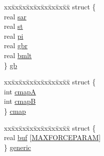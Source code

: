 \begin{DoxyCompactItemize}
\begin{tabbing}
\end{tabbing}\item 
\begin{tabbing}
xx\=xx\=xx\=xx\=xx\=xx\=xx\=xx\=xx\=\kill
struct \{\\
\>real \hyperlink{uniont__iparams_a46042eaae3e88c84bc680ea4d1108e84}{sar}\\
\>real \hyperlink{uniont__iparams_ae77e8a5af1b02825697a5520f754bb0a}{st}\\
\>real \hyperlink{uniont__iparams_a882ce1bd87228259c0185dac598e49e3}{pi}\\
\>real \hyperlink{uniont__iparams_a99d5340b9afa500ec28ed2511c91964f}{gbr}\\
\>real \hyperlink{uniont__iparams_a7f54768c60be5c76f2835aff5cd05d48}{bmlt}\\
\} \hyperlink{uniont__iparams_a2a1571b3d3a2d4c573c22b80619736c2}{gb}\\

\end{tabbing}\item 
\begin{tabbing}
xx\=xx\=xx\=xx\=xx\=xx\=xx\=xx\=xx\=\kill
struct \{\\
\>int \hyperlink{uniont__iparams_a96108be8534affe967e3a4aec97cb72c}{cmapA}\\
\>int \hyperlink{uniont__iparams_af112bc252ed4633980dca8b8756c27ad}{cmapB}\\
\} \hyperlink{uniont__iparams_ad858cc94bb34388aba59412447819a95}{cmap}\\

\end{tabbing}\item 
\begin{tabbing}
xx\=xx\=xx\=xx\=xx\=xx\=xx\=xx\=xx\=\kill
struct \{\\
\>real \hyperlink{uniont__iparams_ac2b28e06a58d003b10de8a80e9aebe85}{buf} \mbox{[}\hyperlink{share_2template_2gromacs_2types_2idef_8h_aa485bece733ea79b0527f4a8b61c8f38}{MAXFORCEPARAM}\mbox{]}\\
\} \hyperlink{uniont__iparams_ab0328fd3a389da8fe5f3c388c77b7da6}{generic}\\

\end{tabbing}\end{DoxyCompactItemize}


